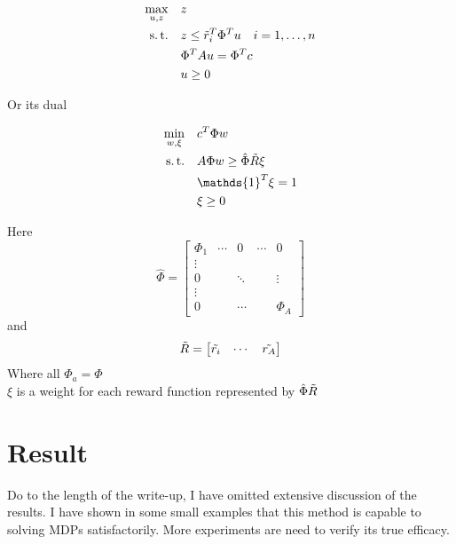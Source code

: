\documentclass{homework}
\begin{document}
\begin{equation}
\begin{aligned}
\max_{u, z}\quad & z\\
\text{s.\,t.} \quad & z \le \Tilde{r}_i^T\Phi^T  u \quad i=1,\ldots,n\\
& \Phi^T A u = \Phi^T c\\
& u \ge 0
\end{aligned}
\end{equation}

Or its dual

\begin{equation}
\begin{aligned}
\min_{w, \xi} \quad & c^T\Phi w\\
\text{s.\,t.} \quad & A \Phi w \ge \hat{\Phi}\Tilde{R}\xi\\
& \mathds{1}^T\xi = 1\\
& \xi \ge 0
\end{aligned}
\end{equation}

Here 
$$\hat{\Phi} = \begin{bmatrix}\Phi_1 & \cdots & 0 & \cdots & 0 \\ \vdots &  \\ 0 & & \ddots & & \vdots \\ \vdots \\ 0 & & \cdots && \Phi_A \end{bmatrix}$$
and 
$$\Tilde{R} = \begin{bmatrix}\Tilde{r_i}&\cdots&\Tilde{r_A}\end{bmatrix}$$
Where all $\Phi_a = \Phi$\\
$\xi$ is a weight for each reward function represented by $\hat{\Phi}\Tilde{R}$

\section{Result}

Do to the length of the write-up, I have omitted extensive discussion of the results. I have shown in some small examples that this method is capable to solving MDPs satisfactorily. More experiments are need to verify its true efficacy.
\pagebreak


\printbibliography
\end{document}
